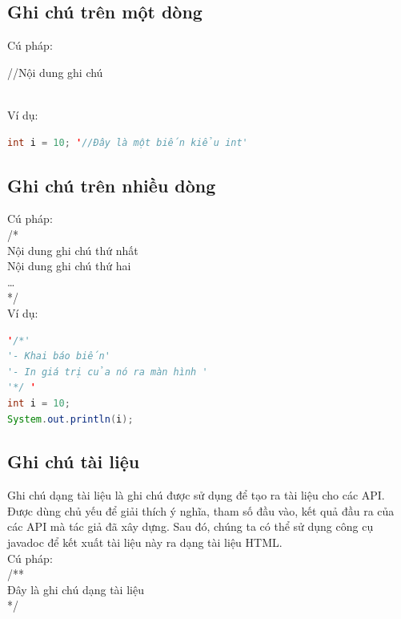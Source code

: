 \subsection{Ghi chú trên một dòng}
\indent Cú pháp: \\
\centerline{\ttfamily //Nội dung ghi chú} \\
\indent Ví dụ:
\begin{lstlisting}[escapechar=',language=java]	
int i = 10; '//Đây là một biến kiểu int'
\end{lstlisting}
\subsection{Ghi chú trên nhiều dòng}
\indent Cú pháp:\\
{\ttfamily
/*\\
Nội dung ghi chú thứ nhất\\
Nội dung ghi chú thứ hai\\
… \\
*/}\\
\indent Ví dụ:

\begin{lstlisting}[escapechar=',language=java]	
'/*'
'- Khai báo biến'
'- In giá trị của nó ra màn hình '
'*/ '
int i = 10; 
System.out.println(i);
\end{lstlisting}

\subsection{Ghi chú tài liệu}
\indent Ghi chú dạng tài liệu là ghi chú được sử dụng để tạo ra tài liệu cho các API. Được dùng chủ yếu để giải thích ý nghĩa, tham số đầu vào, kết quả đầu ra của các API mà tác giả đã xây dựng. Sau đó, chúng ta có thể sử dụng công cụ javadoc để kết xuất tài liệu này ra dạng tài liệu HTML.\\
\indent Cú pháp:\\
{\ttfamily 
/** \\
Đây là ghi chú dạng tài liệu\\
*/}
